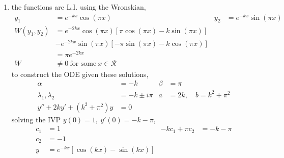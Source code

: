 \begin{enumerate}
    \item the functions are L.I. using the Wronskian,
          \begin{align}
              y_{1}           & = e^{-kx}\cos(\pi x)                       &
              y_{2}           & = e^{-kx}\sin(\pi x)                         \\
              W(y_{1}, y_{2}) & = e^{-2kx}\cos(\pi x)[\pi \cos(\pi x)
              - k\sin(\pi x)]                                                \\
                              & - e^{-2kx}\sin(\pi x) [-\pi \sin(\pi x)
              - k\cos(\pi x)]                                                \\
                              & = \pi e^{-2kx}                               \\
              W               & \neq 0\ \text{for some}\ x \in \mathcal{R}
          \end{align}
          to construct the ODE given these solutions,
          \begin{align}
              \alpha                          & = -k                            &
              \beta                           & = \pi                             \\
              \lambda_{1}, \lambda_{2}        & = -k \pm i\pi                   &
              a                               & = 2k, \quad b = k^{2} + \pi^{2}   \\
              y'' + 2ky' + (k^{2} + \pi^{2})y & = 0
          \end{align}
          solving the IVP $ y(0) = 1,\ y'(0) = -k - \pi $,
          \begin{align}
              c_{1}               & = 1                                        &
              -kc_{1} + \pi c_{2} & = -k-\pi                                     \\
              c_{2}               & = -1                                         \\
              y                   & =e^{-kx}\left[ \cos(kx) - \sin(kx) \right]
          \end{align}


\end{enumerate}
